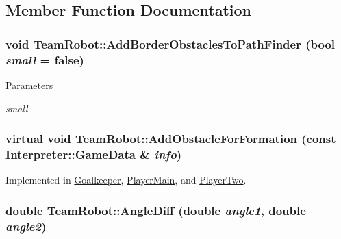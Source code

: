 \subsection{Member Function Documentation}
\hypertarget{classTeamRobot_acf4c435c98bc406744a12cd140d6631d}{
\subsubsection[{AddBorderObstaclesToPathFinder}]{\setlength{\rightskip}{0pt plus 5cm}void TeamRobot::AddBorderObstaclesToPathFinder (bool {\em small} = {\ttfamily false})}}
\label{classTeamRobot_acf4c435c98bc406744a12cd140d6631d}

\begin{DoxyParams}{Parameters}
\item[{\em small}]\end{DoxyParams}
\hypertarget{classTeamRobot_a71ec65db46db1ac511fe17b668d4f192}{
\subsubsection[{AddObstacleForFormation}]{\setlength{\rightskip}{0pt plus 5cm}virtual void TeamRobot::AddObstacleForFormation (const {\bf Interpreter::GameData} \& {\em info})}}
\label{classTeamRobot_a71ec65db46db1ac511fe17b668d4f192}


Implemented in \hyperlink{classGoalkeeper_a5287a2e74795bbec8f0ead767655da5d}{Goalkeeper}, \hyperlink{classPlayerMain_a978b3ce16f5d8e5d1cb9ef70f387227e}{PlayerMain}, and \hyperlink{classPlayerTwo_a9e3341541658f54a2dfb0491a774b4d4}{PlayerTwo}.

\hypertarget{classTeamRobot_a45d5d631b1e1e28c9c0f4ecbd47fdbde}{
\subsubsection[{AngleDiff}]{\setlength{\rightskip}{0pt plus 5cm}double TeamRobot::AngleDiff (double {\em angle1}, \/  double {\em angle2})}}
\label{classTeamRobot_a45d5d631b1e1e28c9c0f4ecbd47fdbde}


